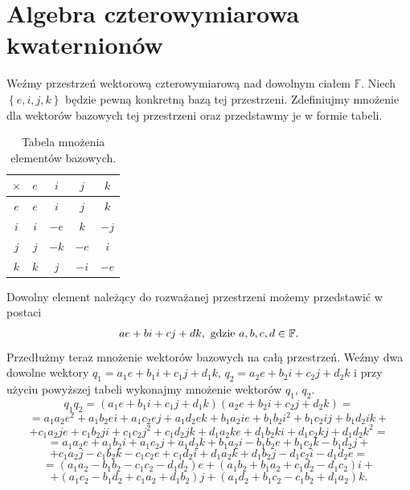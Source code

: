 \documentclass[a4paper,twoside,11pt,reqno]{mwrep}
\theoremstyle{plain} \newtheorem{twr}{Twierdzenie}
\theoremstyle{plain} \newtheorem{lem}{Lemat}
\theoremstyle{definition} \newtheorem{defi}{Definicja}
\theoremstyle{remark} \newtheorem*{wni}{Wniosek}
\theoremstyle{definition} \newtheorem{uwaga}{Uwaga}
\theoremstyle{definition}\newtheorem{prz}{Przykład}
\begin{document}
\chapter{Algebra czterowymiarowa kwaternionów}
Weźmy przestrzeń wektorową czterowymiarową nad dowolnym ciałem $\mathbb{F}$.
Niech $\left\{ e,i,j,k \right\}$ będzie pewną konkretną bazą tej przestrzeni.
Zdefiniujmy mnożenie dla wektorów bazowych tej przestrzeni oraz przedstawmy je w formie tabeli.\\

\begin{table}[h]
    \centering
      \caption{\label{table}Tabela mnożenia elementów bazowych.}
    \begin{tabular}{|c|c|c|c|c|}
        \hline
        \rowcolor{gray}$\times$ & $e$&$i$& $j$& $k$\\\hline 
         \cellcolor{gray}$e$&\cellcolor{gray!25}$e$&\cellcolor{gray!25}$i$
         &\cellcolor{gray!25}$j$&\cellcolor{gray!25}$k$\\ \hline
         \cellcolor{gray}$i$&\cellcolor{gray!25}$i$&\cellcolor{gray!25}$-e$&
         \cellcolor{gray!25}$k$&\cellcolor{gray!25}$-j$\\ \hline
         \cellcolor{gray}$j$&\cellcolor{gray!25}$j$&\cellcolor{gray!25}$-k$&\cellcolor{gray!25}$-e$&\cellcolor{gray!25}$i$\\ \hline
         \cellcolor{gray}$k$&\cellcolor{gray!25}$k$&\cellcolor{gray!25}$j$&
         \cellcolor{gray!25}$-i$&\cellcolor{gray!25}$-e$\\ \hline
    \end{tabular}

\end{table}


\noindent
Dowolny element należący do rozważanej przestrzeni możemy przedstawić w postaci
$$ae+bi+cj+dk,\textup{ gdzie }a,b,c,d\in\mathbb{F}.$$ 
Przedłużmy teraz mnożenie wektorów bazowych na całą przestrzeń. Weźmy dwa dowolne wektory 
$q_1=a_1e +b_1 i +c_1j +d_1 k$, $q_2=a_2e +b_2 i +c_2j +d_2 k$ i przy użyciu powyższej tabeli wykonajmy mnożenie wektorów $q_1$, $q_2$. 
$$q_1q_2 = (a_1e +b_1 i +c_1j +d_1 k)(a_2e +b_2 i +c_2j +d_2 k)=$$
$$=a_1a_2 e^2 +a_1b_2ei +a_1c_2ej+a_1d_2ek+b_1a_2 ie +b_1b_2i^2 +b_1c_2ij+b_1d_2ik +$$
$$+c_1a_2je +c_1b_2ji +c_1c_2j^2+c_1d_2jk+d_1a_2 ke +d_1b_2ki +d_1c_2kj+d_1d_2k^2=$$
$$=a_1a_2 e +a_1b_2i +a_1c_2j+a_1d_2k+b_1a_2 i -b_1b_2e +b_1c_2k-b_1d_2j +$$
$$+c_1a_2j -c_1b_2k -c_1c_2e+c_1d_2i+d_1a_2 k +d_1b_2j -d_1c_2i-d_1d_2e=$$
$$= (a_1 a_2-b_1b_2-c_1c_2-d_1d_2)e+(a_1b_2+b_1a_2+c_1d_2-d_1c_2)i+$$
$$+(a_1c_2-b_1d_2+c_1a_2+d_1b_2)j+(a_1d_2+b_1c_2-c_1b_2+d_1a_2)k.$$
\end{document}
